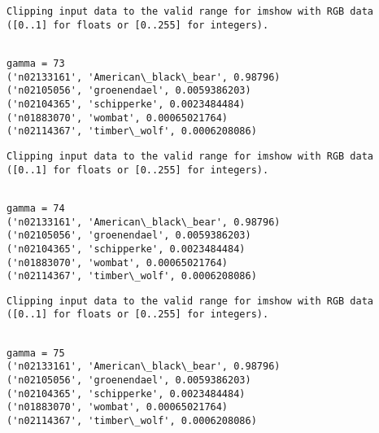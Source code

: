 \documentclass[11pt]{article}
\begin{document}
    \begin{Verbatim}[commandchars=\\\{\}]
Clipping input data to the valid range for imshow with RGB data ([0..1] for floats or [0..255] for integers).

    \end{Verbatim}

    \begin{Verbatim}[commandchars=\\\{\}]

gamma = 73
('n02133161', 'American\_black\_bear', 0.98796)
('n02105056', 'groenendael', 0.0059386203)
('n02104365', 'schipperke', 0.0023484484)
('n01883070', 'wombat', 0.00065021764)
('n02114367', 'timber\_wolf', 0.0006208086)

    \end{Verbatim}

    \begin{Verbatim}[commandchars=\\\{\}]
Clipping input data to the valid range for imshow with RGB data ([0..1] for floats or [0..255] for integers).

    \end{Verbatim}

    \begin{Verbatim}[commandchars=\\\{\}]

gamma = 74
('n02133161', 'American\_black\_bear', 0.98796)
('n02105056', 'groenendael', 0.0059386203)
('n02104365', 'schipperke', 0.0023484484)
('n01883070', 'wombat', 0.00065021764)
('n02114367', 'timber\_wolf', 0.0006208086)

    \end{Verbatim}

    \begin{Verbatim}[commandchars=\\\{\}]
Clipping input data to the valid range for imshow with RGB data ([0..1] for floats or [0..255] for integers).

    \end{Verbatim}

    \begin{Verbatim}[commandchars=\\\{\}]

gamma = 75
('n02133161', 'American\_black\_bear', 0.98796)
('n02105056', 'groenendael', 0.0059386203)
('n02104365', 'schipperke', 0.0023484484)
('n01883070', 'wombat', 0.00065021764)
('n02114367', 'timber\_wolf', 0.0006208086)

    \end{Verbatim}
\end{document}
